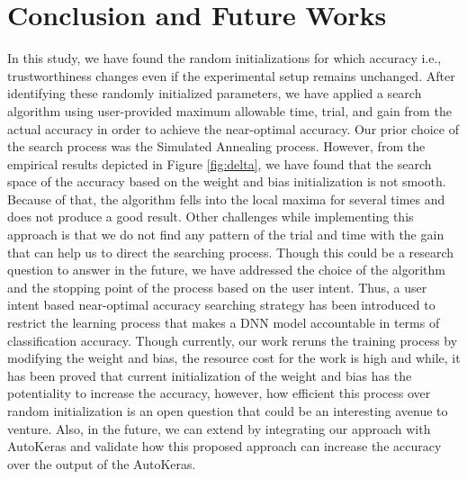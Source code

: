 \section{Conclusion and Future Works}
\label{sec:future}
In this study, we have found the random initializations for which accuracy i.e., trustworthiness changes even if the experimental setup remains unchanged. After identifying these randomly initialized parameters, we have applied a search algorithm using user-provided maximum allowable time, trial, and gain from the actual accuracy in order to achieve the near-optimal accuracy. Our prior choice of the search process was the Simulated Annealing process. However, from the empirical results depicted in Figure \ref{fig:delta}, we have found that the search space of the accuracy based on the weight and bias initialization is not smooth. Because of that, the algorithm fells into the local maxima for several times and does not produce a good result. Other challenges while implementing this approach is that we do not find any pattern of the trial and time with the gain that can help us to direct the searching process. Though this could be a research question to answer in the future, we have addressed the choice of the algorithm and the stopping point of the process based on the user intent.
Thus, a user intent based near-optimal accuracy searching strategy has been introduced to restrict the learning process that makes a DNN model accountable in terms of classification accuracy. Though currently, our work reruns the training process by modifying the weight and bias, the resource cost for the work is high and while, it has been proved that current initialization of the weight and bias has the potentiality to increase the accuracy, however, how efficient this process over random initialization is an open question that could be an interesting avenue to venture. Also, in the future, we can extend by integrating our approach with AutoKeras \cite{jin2019auto} and validate how this proposed approach can increase the accuracy over the output of the AutoKeras.

